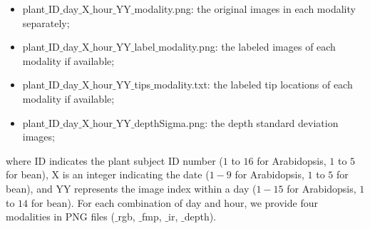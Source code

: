 \begin{itemize}
\item plant$\_$ID$\_$day$\_$X$\_$hour$\_$YY$\_$modality.png: the original images in each modality separately;
\item plant$\_$ID$\_$day$\_$X$\_$hour$\_$YY$\_$label$\_$modality.png: the labeled images of each modality if available;
\item plant$\_$ID$\_$day$\_$X$\_$hour$\_$YY$\_$tips$\_$modality.txt: the labeled tip locations of each modality if available;
\item plant$\_$ID$\_$day$\_$X$\_$hour$\_$YY$\_$depthSigma.png: the depth standard deviation images;
\end{itemize}
where ID indicates the plant subject ID number ($1$ to $16$ for Arabidopsis, $1$ to $5$ for bean), X is an integer indicating the date ($1-9$ for Arabidopsis, $1$ to $5$ for bean), and YY represents the image index within a day ($1-15$ for Arabidopsis, $1$ to $14$ for bean).
For each combination of day and hour, we provide four modalities in PNG files ($\_$rgb, $\_$fmp, $\_$ir, $\_$depth).
